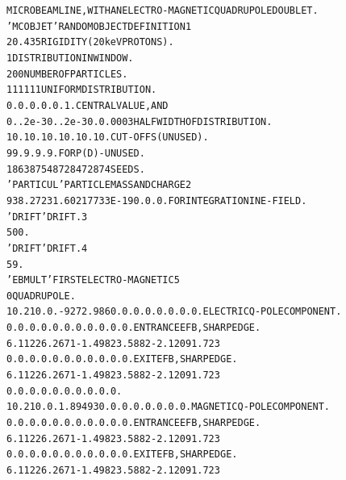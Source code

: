 \begin{tiny}
\begin{center}
\begin{alltt}

  MICROBEAM LINE, WITH AN ELECTRO-MAGNETIC QUADRUPOLE DOUBLET.                    
  'MCOBJET'                                     RANDOM  OBJECT  DEFINITION   1      
  20.435                                          RIGIDITY (20keV  PROTONS).     
  1                                               DISTRIBUTION IN WINDOW.        
  200                                             NUMBER  OF  PARTICLES.         
  1    1     1    1     1    1                    UNIFORM DISTRIBUTION.          
  0.   0.    0.   0.    0.   1.                   CENTRAL  VALUE,  AND           
  0.  .2e-3  0.  .2e-3  0.   0.0003               HALF WIDTH OF DISTRIBUTION.    
  10.  10.   10.  10.   10.  10.                  CUT-OFFS (UNUSED).             
  9   9. 9. 9. 9.                                 FOR P(D) - UNUSED.             
  186387 548728 472874                            SEEDS.                         
   'PARTICUL'                                   PARTICLE MASS AND CHARGE   2      
    938.2723 1.60217733E-19 0. 0. 0.              FOR INTEGRATION IN E-FIELD.    
  'DRIFT'                                       DRIFT.                    3      
  500.                                                                           
  'DRIFT'                                       DRIFT.                    4      
  59.                                                                            
  'EBMULT'                                      FIRST ELECTRO-MAGNETIC     5      
   0                                                            QUADRUPOLE.      
  10.2  10. 0. -9272.986  0. 0. 0. 0. 0. 0. 0. 0.     ELECTRIC Q-POLE COMPONENT. 
   0.  0.  0.  0.  0.  0.  0.  0. 0. 0. 0.            ENTRANCE EFB, SHARP EDGE.  
  6  .1122 6.2671 -1.4982 3.5882 -2.1209 1.723                                   
   0.  0.  0.  0.  0.  0.  0.  0. 0. 0. 0.            EXIT EFB, SHARP EDGE.      
  6  .1122 6.2671 -1.4982 3.5882 -2.1209 1.723                                   
   0. 0. 0. 0. 0. 0. 0. 0. 0. 0.                                                 
  10.2  10. 0.  1.89493  0. 0. 0. 0.  0. 0. 0. 0.     MAGNETIC Q-POLE COMPONENT. 
   0.  0.  0.  0.  0.  0.  0.  0. 0. 0. 0.            ENTRANCE EFB, SHARP EDGE.  
  6  .1122 6.2671 -1.4982 3.5882 -2.1209 1.723                                   
   0.  0.  0.  0.  0.  0.  0.   0. 0. 0. 0.           EXIT EFB, SHARP EDGE.      
  6  .1122 6.2671 -1.4982 3.5882 -2.1209 1.723                                   

\end{alltt}
\end{center}
\end{tiny}
